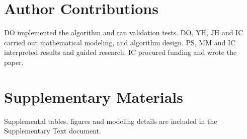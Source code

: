 \documentclass[onecolumn,10pt]{IEEEtran}
\begin{document}
\section*{Author Contributions}
DO implemented the algorithm and ran validation tests. DO, YH, JH and IC carried out mathematical modeling, and  algorithm design. PS, MM and IC interpreted results and guided research.
IC procured funding and  wrote the paper.

\section*{Supplementary Materials} Supplemental tables, figures and modeling details are included in the Supplementary Text document.


\nocite{*}

\end{document}
